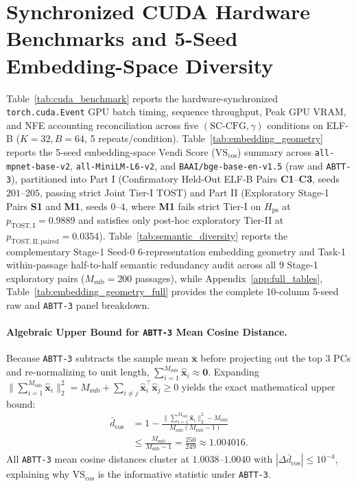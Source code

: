 \documentclass[11pt,a4paper]{article}
\begin{document}
\section{Synchronized CUDA Hardware Benchmarks and 5-Seed Embedding-Space Diversity}
\label{app:cuda_semantic}

Table~\ref{tab:cuda_benchmark} reports the hardware-synchronized \texttt{torch.cuda.Event} GPU batch timing, sequence throughput, Peak GPU VRAM, and NFE accounting reconciliation across five $(\text{SC-CFG}, \gamma)$ conditions on ELF-B ($K=32, B=64$, 5 repeats/condition). Table~\ref{tab:embedding_geometry} reports the 5-seed embedding-space Vendi Score ($\mathrm{VS}_{\cos}$) summary across \texttt{all-mpnet-base-v2}, \texttt{all-MiniLM-L6-v2}, and \texttt{BAAI/bge-base-en-v1.5} (raw and \texttt{ABTT-3}), partitioned into Part I (Confirmatory Held-Out ELF-B Pairs \textbf{C1}--\textbf{C3}, seeds $201\text{--}205$, passing strict Joint Tier-I TOST) and Part II (Exploratory Stage-1 Pairs \textbf{S1} and \textbf{M1}, seeds $0\text{--}4$, where \textbf{M1} fails strict Tier-I on $H_{\mathrm{ps}}$ at $p_{\mathrm{TOST,I}}=0.9889$ and satisfies only post-hoc exploratory Tier-II at $p_{\mathrm{TOST,II,paired}}=0.0354$). Table~\ref{tab:semantic_diversity} reports the complementary Stage-1 Seed-0 6-representation embedding geometry and Task-1 within-passage half-to-half semantic redundancy audit across all 9 Stage-1 exploratory pairs ($M_{\mathrm{sub}}=200$ passages), while Appendix~\ref{app:full_tables}, Table~\ref{tab:embedding_geometry_full} provides the complete 10-column 5-seed raw and \texttt{ABTT-3} panel breakdown.

\paragraph{Algebraic Upper Bound for \texttt{ABTT-3} Mean Cosine Distance.}
Because \texttt{ABTT-3} subtracts the sample mean $\bar{\mathbf{x}}$ before projecting out the top 3 PCs and re-normalizing to unit length, $\sum_{i=1}^{M_{\mathrm{sub}}} \hat{\mathbf{x}}_i \approx \mathbf{0}$. Expanding $\|\sum_{i=1}^{M_{\mathrm{sub}}} \hat{\mathbf{x}}_i\|_2^2 = M_{\mathrm{sub}} + \sum_{i\neq j}\hat{\mathbf{x}}_i^\top \hat{\mathbf{x}}_j \ge 0$ yields the exact mathematical upper bound:
\begin{equation}
    \begin{aligned}
        \bar{d}_{\cos} &= 1 - \frac{\|\sum_{i=1}^{M_{\mathrm{sub}}}\hat{\mathbf{x}}_i\|_2^2 - M_{\mathrm{sub}}}{M_{\mathrm{sub}}(M_{\mathrm{sub}}-1)} \\
        &\le \frac{M_{\mathrm{sub}}}{M_{\mathrm{sub}}-1} = \frac{250}{249} \approx 1.004016.
    \end{aligned}
    \label{eq:abtt_bound}
\end{equation}
All \texttt{ABTT-3} mean cosine distances cluster at $1.0038\text{--}1.0040$ with $|\Delta\bar{d}_{\cos}| \le 10^{-4}$, explaining why $\mathrm{VS}_{\cos}$ is the informative statistic under \texttt{ABTT-3}.
\end{document}
